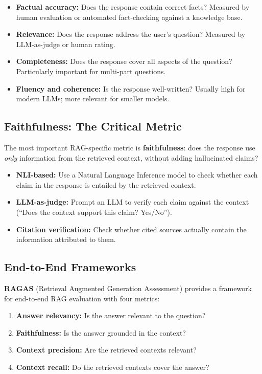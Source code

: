 \begin{itemize}
    \item \textbf{Factual accuracy:} Does the response contain correct facts?
          Measured by human evaluation or automated fact-checking against a
          knowledge base.
    \item \textbf{Relevance:} Does the response address the user's question?
          Measured by LLM-as-judge or human rating.
    \item \textbf{Completeness:} Does the response cover all aspects of the
          question?  Particularly important for multi-part questions.
    \item \textbf{Fluency and coherence:} Is the response well-written?
          Usually high for modern LLMs; more relevant for smaller models.
\end{itemize}

\subsection{Faithfulness: The Critical Metric}

The most important RAG-specific metric is \textbf{faithfulness}: does the
response use \emph{only} information from the retrieved context, without
adding hallucinated claims?

\begin{itemize}
    \item \textbf{NLI-based:} Use a Natural Language Inference model to check
          whether each claim in the response is entailed by the retrieved
          context.
    \item \textbf{LLM-as-judge:} Prompt an LLM to verify each claim against
          the context (``Does the context support this claim? Yes/No'').
    \item \textbf{Citation verification:} Check whether cited sources actually
          contain the information attributed to them.
\end{itemize}

\subsection{End-to-End Frameworks}

\textbf{RAGAS} (Retrieval Augmented Generation Assessment) provides a
framework for end-to-end RAG evaluation with four metrics:
\begin{enumerate}
    \item \textbf{Answer relevancy:} Is the answer relevant to the question?
    \item \textbf{Faithfulness:} Is the answer grounded in the context?
    \item \textbf{Context precision:} Are the retrieved contexts relevant?
    \item \textbf{Context recall:} Do the retrieved contexts cover the answer?
\end{enumerate}

